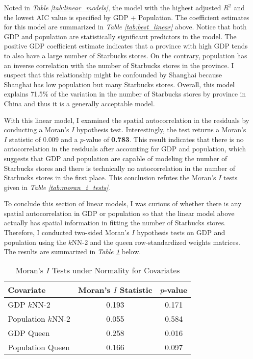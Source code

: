 \documentclass{article}
\begin{document}
Noted in \textit{Table \ref{tab:linear_models}}, the model with the highest adjusted \(R^2\) and the lowest AIC value is specified by GDP + Population. The coefficient estimates for this model are summarized in \textit{Table \ref{tab:best_linear}} above. Notice that both GDP and population are statistically significant predictors in the model. The positive GDP coefficient estimate indicates that a province with high GDP tends to also have a large number of Starbucks stores. On the contrary, population has an inverse correlation with the number of Starbucks stores in the province. I suspect that this relationship might be confounded by Shanghai because Shanghai has low population but many Starbucks stores. Overall, this model explains 71.5\% of the variation in the number of Starbucks stores by province in China and thus it is a generally acceptable model.

With this linear model, I examined the spatial autocorrelation in the residuals by conducting a Moran's \(I\) hypothesis test. Interestingly, the test returns a Moran's \(I\) statistic of 0.009 and a \(p\)-value of \textbf{0.783}. This result indicates that there is no autocorrelation in the residuals after accounting for GDP and population, which suggests that GDP and population are capable of modeling the number of Starbucks stores and there is technically no autocorrelation in the number of Starbucks stores in the first place. This conclusion refutes the Moran's \(I\) tests given in \textit{Table \ref{tab:moran_i_tests}}.

To conclude this section of linear models, I was curious of whether there is any spatial autocorrelation in GDP or population so that the linear model above actually has spatial information in fitting the number of Starbucks stores. Therefore, I conducted two-sided Moran's \(I\) hypothesis tests on GDP and population using the \(k\)NN-2 and the queen row-standardized weights matrices. The results are summarized in \textit{Table \ref{tab:moran_i_tests_covariates}} below.

\begin{table}[htbp]
    \centering
    \begin{tabular}{l c c}
        \toprule
        \textbf{Covariate} & \textbf{Moran's \(I\) Statistic} & \textbf{\(p\)-value} \\
        \midrule
        GDP \(k\)NN-2 & 0.193 & 0.171 \\
        Population \(k\)NN-2 & 0.055 & 0.584 \\
        GDP Queen & 0.258 & 0.016 \\
        Population Queen & 0.166 & 0.097 \\
        \bottomrule
    \end{tabular}
    \caption{Moran's \(I\) Tests under Normality for Covariates}
    \label{tab:moran_i_tests_covariates}
\end{table}
\end{document}
